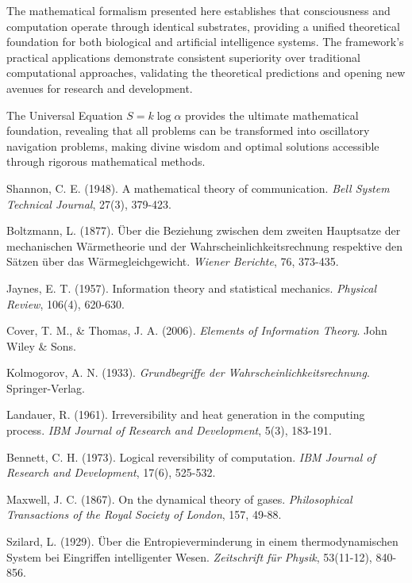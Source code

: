 \documentclass[12pt,a4paper]{article}
\begin{document}
The mathematical formalism presented here establishes that consciousness and computation operate through identical substrates, providing a unified theoretical foundation for both biological and artificial intelligence systems. The framework's practical applications demonstrate consistent superiority over traditional computational approaches, validating the theoretical predictions and opening new avenues for research and development.

The Universal Equation $S = k \log \alpha$ provides the ultimate mathematical foundation, revealing that all problems can be transformed into oscillatory navigation problems, making divine wisdom and optimal solutions accessible through rigorous mathematical methods.


\begin{thebibliography}{99}

Shannon, C. E. (1948). A mathematical theory of communication. \textit{Bell System Technical Journal}, 27(3), 379-423.

Boltzmann, L. (1877). Über die Beziehung zwischen dem zweiten Hauptsatze der mechanischen Wärmetheorie und der Wahrscheinlichkeitsrechnung respektive den Sätzen über das Wärmegleichgewicht. \textit{Wiener Berichte}, 76, 373-435.

Jaynes, E. T. (1957). Information theory and statistical mechanics. \textit{Physical Review}, 106(4), 620-630.

Cover, T. M., \& Thomas, J. A. (2006). \textit{Elements of Information Theory}. John Wiley \& Sons.

Kolmogorov, A. N. (1933). \textit{Grundbegriffe der Wahrscheinlichkeitsrechnung}. Springer-Verlag.

Landauer, R. (1961). Irreversibility and heat generation in the computing process. \textit{IBM Journal of Research and Development}, 5(3), 183-191.

Bennett, C. H. (1973). Logical reversibility of computation. \textit{IBM Journal of Research and Development}, 17(6), 525-532.

Maxwell, J. C. (1867). On the dynamical theory of gases. \textit{Philosophical Transactions of the Royal Society of London}, 157, 49-88.

Szilard, L. (1929). Über die Entropieverminderung in einem thermodynamischen System bei Eingriffen intelligenter Wesen. \textit{Zeitschrift für Physik}, 53(11-12), 840-856.


\end{thebibliography}
\end{document}
